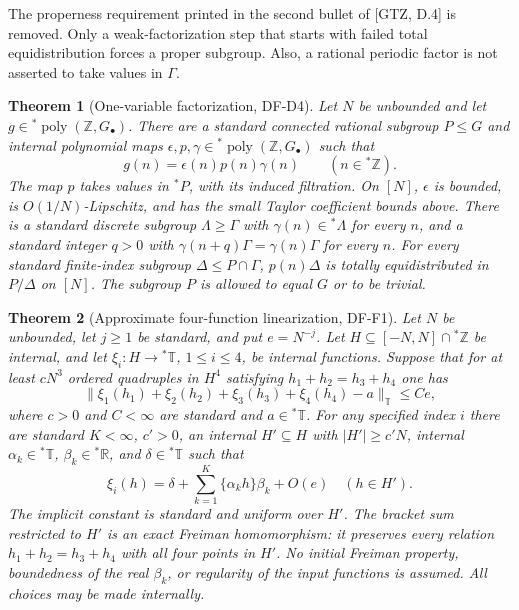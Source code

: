 \documentclass[11pt]{article}
\newtheorem{theorem}{Theorem}
\newcommand{\T}{\mathbb T}
\newcommand{\Z}{\mathbb Z}
\newcommand{\R}{\mathbb R}
\newcommand{\poly}{\operatorname{poly}}
\begin{document}
The properness requirement printed in the second bullet of [GTZ, D.4] is
removed. Only a weak-factorization step that starts with failed total
equidistribution forces a proper subgroup. Also, a rational periodic factor
is not asserted to take values in $\Gamma$.

\begin{theorem}[One-variable factorization, DF-D4]\label{thm:D}
Let $N$ be unbounded and let $g\in{}^*\poly(\Z,G_\bullet)$.
There are a standard connected rational subgroup $P\leq G$ and internal
polynomial maps $\epsilon,p,\gamma\in{}^*\poly(\Z,G_\bullet)$ such that
\[
             g(n)=\epsilon(n)p(n)\gamma(n)\qquad(n\in{}^*\Z).
\]
The map $p$ takes values in ${}^*P$, with its induced filtration. On $[N]$,
$\epsilon$ is bounded, is $O(1/N)$-Lipschitz, and has the small Taylor
coefficient bounds above. There is a standard discrete subgroup
$\Lambda\geq\Gamma$ with $\gamma(n)\in{}^*\Lambda$ for every $n$, and a
standard integer $q>0$ with
$\gamma(n+q)\Gamma=\gamma(n)\Gamma$ for every $n$.
For every standard finite-index subgroup $\Delta\leq P\cap\Gamma$,
$p(n)\Delta$ is totally equidistributed in $P/\Delta$ on $[N]$.
The subgroup $P$ is allowed to equal $G$ or to be trivial.
\end{theorem}

\begin{theorem}[Approximate four-function linearization, DF-F1]\label{thm:F}
Let $N$ be unbounded, let $j\geq1$ be standard, and put $e=N^{-j}$.
Let $H\subseteq[-N,N]\cap{}^*\Z$ be internal, and let
$\xi_i:H\to{}^*\T$, $1\leq i\leq4$, be internal functions.
Suppose that for at least $cN^3$ ordered quadruples in $H^4$ satisfying
$h_1+h_2=h_3+h_4$ one has
\[
 \|\xi_1(h_1)+\xi_2(h_2)+\xi_3(h_3)+\xi_4(h_4)-a\|_\T\leq C e,
\]
where $c>0$ and $C<\infty$ are standard and $a\in{}^*\T$.
For any specified index $i$ there are standard $K<\infty$, $c'>0$,
an internal $H'\subseteq H$ with $|H'|\geq c'N$, internal
$\alpha_k\in{}^*\T$, $\beta_k\in{}^*\R$, and $\delta\in{}^*\T$ such that
\[
 \xi_i(h)=\delta+\sum_{k=1}^K\{\alpha_kh\}\beta_k+O(e)
                    \quad(h\in H').                                      \tag{F}
\]
The implicit constant is standard and uniform over $H'$.
The bracket sum restricted to $H'$ is an exact Freiman homomorphism:
it preserves every relation $h_1+h_2=h_3+h_4$ with all four points in $H'$.
No initial Freiman property, boundedness of the real $\beta_k$, or regularity
of the input functions is assumed. All choices may be made internally.
\end{theorem}
\end{document}
